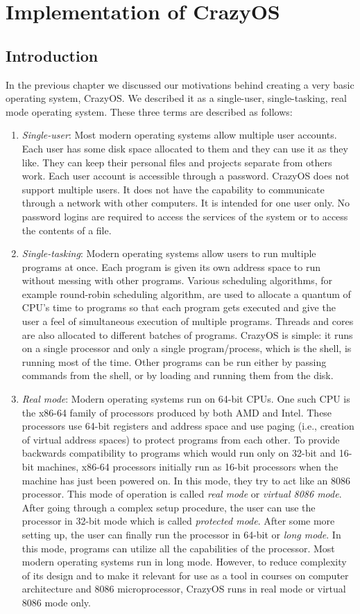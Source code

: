 \chapter{\centering Implementation of CrazyOS}

\section{Introduction}
In the previous chapter we discussed our motivations behind creating a very basic operating system, CrazyOS. We described it as a single-user, single-tasking, real mode operating system. These three terms are described as follows:
\begin{enumerate}
  \item \textit{Single-user}: Most modern operating systems allow multiple user accounts. Each user has some disk space allocated to them and they can use it as they like. They can keep their personal files and projects separate from others work. Each user account is accessible through a password. CrazyOS does not support multiple users. It does not have the capability to communicate through a network with other computers. It is intended for one user only. No password logins are required to access the services of the system or to access the contents of a file.
  \item \textit{Single-tasking}: Modern operating systems allow users to run multiple programs at once. Each program is given its own address space to run without messing with other programs. Various scheduling algorithms, for example round-robin scheduling algorithm, are used to allocate a quantum of CPU's time to programs so that each program gets executed and give the user a feel of simultaneous execution of multiple programs. Threads and cores are also allocated to different batches of programs. CrazyOS is simple: it runs on a single processor and only a single program/process, which is the shell, is running most of the time. Other programs can be run either by passing commands from the shell, or by loading and running them from the disk.
  \item \textit{Real mode}: Modern operating systems run on 64-bit CPUs. One such CPU is the x86-64 family of processors produced by both AMD and Intel. These processors use 64-bit registers and address space and use paging (i.e., creation of virtual address spaces) to protect programs from each other. To provide backwards compatibility to programs which would run only on 32-bit and 16-bit machines, x86-64 processors initially run as 16-bit processors when the machine has just been powered on. In this mode, they try to act like an 8086 processor. This mode of operation is called \textit{real mode} or \textit{virtual 8086 mode}. After going through a complex setup procedure, the user can use the processor in 32-bit mode which is called \textit{protected mode}. After some more setting up, the user can finally run the processor in 64-bit or \textit{long mode}. In this mode, programs can utilize all the capabilities of the processor. Most modern operating systems run in long mode. However, to reduce complexity of its design and to make it relevant for use as a tool in courses on computer architecture and 8086 microprocessor, CrazyOS runs in real mode or virtual 8086 mode only.   

\end{enumerate}
